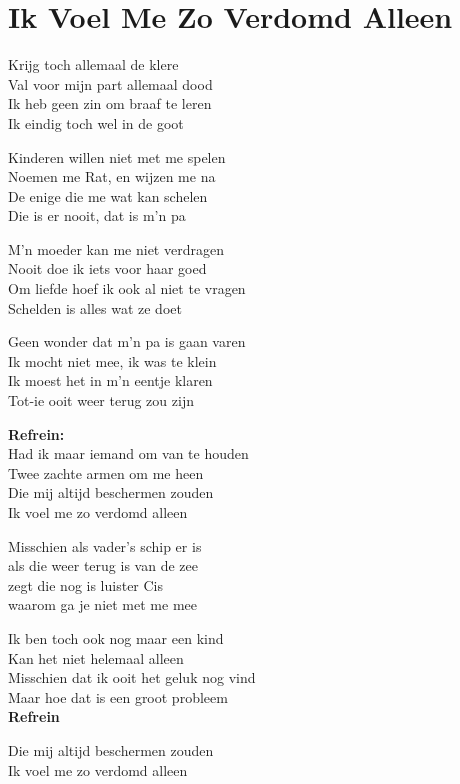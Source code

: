 \section{Ik Voel Me Zo Verdomd Alleen}
Krijg toch allemaal de klere\\
Val voor mijn part allemaal dood\\
Ik heb geen zin om braaf te leren\\
Ik eindig toch wel in de goot

Kinderen willen niet met me spelen\\
Noemen me Rat, en wijzen me na\\
De enige die me wat kan schelen\\
Die is er nooit, dat is m'n pa

M'n moeder kan me niet verdragen\\
Nooit doe ik iets voor haar goed\\
Om liefde hoef ik ook al niet te vragen\\
Schelden is alles wat ze doet

Geen wonder dat m'n pa is gaan varen\\
Ik mocht niet mee, ik was te klein\\
Ik moest het in m'n eentje klaren\\
Tot-ie ooit weer terug zou zijn

\textbf{Refrein:}\\
Had ik maar iemand om van te houden\\
Twee zachte armen om me heen\\
Die mij altijd beschermen zouden\\
Ik voel me zo verdomd alleen

Misschien als vader's schip er is\\
als die weer terug is van de zee\\
zegt die nog is luister Cis\\
waarom ga je niet met me mee

Ik ben toch ook nog maar een kind\\
Kan het niet helemaal alleen\\
Misschien dat ik ooit het geluk nog vind\\
Maar hoe dat is een groot probleem\\

\textbf{Refrein}

Die mij altijd beschermen zouden\\
Ik voel me zo verdomd alleen
